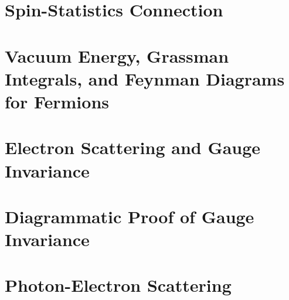 \documentclass[]{article}
\begin{document}
\section{Spin-Statistics Connection}
\section{Vacuum Energy, Grassman Integrals, and Feynman Diagrams for Fermions}
\section{Electron Scattering and Gauge Invariance}
\section{Diagrammatic Proof of Gauge Invariance}
\section{Photon-Electron Scattering}


\raggedright

\end{document}
